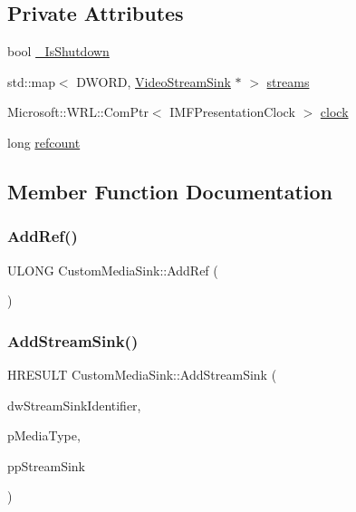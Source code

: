 \subsection*{Private Attributes}
\begin{DoxyCompactItemize}
\item 
bool \hyperlink{class_custom_media_sink_a01f7ea8414d4a1acc2cd11529c375637}{\+\_\+\+Is\+Shutdown}
\item 
std\+::map$<$ D\+W\+O\+RD, \hyperlink{class_video_stream_sink}{Video\+Stream\+Sink} $\ast$ $>$ \hyperlink{class_custom_media_sink_a4849e30bda1e381d2237d085ac4f90da}{streams}
\item 
Microsoft\+::\+W\+R\+L\+::\+Com\+Ptr$<$ I\+M\+F\+Presentation\+Clock $>$ \hyperlink{class_custom_media_sink_a76f04a9bab9e51a358e094b107b16420}{clock}
\item 
long \hyperlink{class_custom_media_sink_acf794c42eae5aa0d5b6e0b5ae7a1085f}{refcount}
\end{DoxyCompactItemize}


\subsection{Member Function Documentation}
\mbox{\label{class_custom_media_sink_a915bf7d17d72e4fd3ef68996a4ee0be8}} 
\subsubsection{\texorpdfstring{Add\+Ref()}{AddRef()}}
{\footnotesize\ttfamily U\+L\+O\+NG Custom\+Media\+Sink\+::\+Add\+Ref (\begin{DoxyParamCaption}{ }\end{DoxyParamCaption})\hspace{0.3cm}{\ttfamily [override]}}

\mbox{\label{class_custom_media_sink_a3d925ae017fe43fb4458481e01096dea}} 
\subsubsection{\texorpdfstring{Add\+Stream\+Sink()}{AddStreamSink()}}
{\footnotesize\ttfamily H\+R\+E\+S\+U\+LT Custom\+Media\+Sink\+::\+Add\+Stream\+Sink (\begin{DoxyParamCaption}\item[{D\+W\+O\+RD}]{dw\+Stream\+Sink\+Identifier,  }\item[{I\+M\+F\+Media\+Type $\ast$}]{p\+Media\+Type,  }\item[{I\+M\+F\+Stream\+Sink $\ast$$\ast$}]{pp\+Stream\+Sink }\end{DoxyParamCaption})\hspace{0.3cm}{\ttfamily [override]}}

